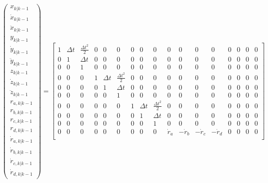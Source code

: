 \begin{equation*}
    \begin{pmatrix}
        x_{k|k-1}\\
        \dot{x}_{k|k-1}\\
        \ddot{x}_{k|k-1}\\
        y_{k|k-1}\\
        \dot{y}_{k|k-1}\\
        \ddot{y}_{k|k-1}\\
        z_{k|k-1}\\
        \dot{z}_{k|k-1}\\
        \ddot{z}_{k|k-1}\\
        r_{a,k|k-1}\\
        r_{b,k|k-1}\\
        r_{c,k|k-1}\\
        r_{d,k|k-1}\\
        \dot{r}_{a,k|k-1}\\
        \dot{r}_{b,k|k-1}\\
        \dot{r}_{c,k|k-1}\\
        \dot{r}_{d,k|k-1}
    \end{pmatrix} = 
    \begin{bmatrix}
        1 & \Delta t & \frac{\Delta t^{2}}{2} & 0 & 0 & 0 & 0 & 0 & 0 & 0 & 0 & 0 & 0 & 0 & 0 & 0 & 0 \\
        0 & 1 & \Delta t & 0 & 0 & 0 & 0 & 0 & 0 & 0 & 0 & 0 & 0 & 0 & 0 & 0 & 0 \\
        0 & 0 & 1 & 0 & 0 & 0 & 0 & 0 & 0 & 0 & 0 & 0 & 0 & 0 & 0 & 0 & 0 \\
        0 & 0 & 0 & 1 & \Delta t & \frac{\Delta t^{2}}{2} & 0 & 0 & 0 & 0 & 0 & 0 & 0 & 0 & 0 & 0 & 0 \\
        0 & 0 & 0 & 0 & 1 & \Delta t & 0 & 0 & 0 & 0 & 0 & 0 & 0 & 0 & 0 & 0 & 0 \\
        0 & 0 & 0 & 0 & 0 & 1 & 0 & 0 & 0 & 0 & 0 & 0 & 0 & 0 & 0 & 0 & 0 \\
        0 & 0 & 0 & 0 & 0 & 0 & 1 & \Delta t & \frac{\Delta t^{2}}{2} & 0 & 0 & 0 & 0 & 0 & 0 & 0 & 0 \\
        0 & 0 & 0 & 0 & 0 & 0 & 0 & 1 & \Delta t & 0 & 0 & 0 & 0 & 0 & 0 & 0 & 0 \\
        0 & 0 & 0 & 0 & 0 & 0 & 0 & 0 & 1 & 0 & 0 & 0 & 0 & 0 & 0 & 0 & 0 \\
        0 & 0 & 0 & 0 & 0 & 0 & 0 & 0 & 0 & \dot{r}_{a} & -\dot{r}_{b} & -\dot{r}_{c} & -\dot{r}_{d} & 0 & 0 & 0 & 0 \\

\end{bmatrix}
\end{equation*}
